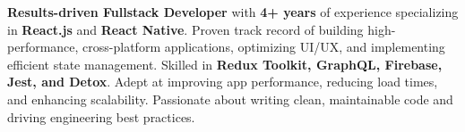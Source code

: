 \vspace{3pt}
\textbf{Results-driven Fullstack Developer} with \textbf{4+ years} of experience specializing in \textbf{React.js} and \textbf{React Native}. Proven track record of building high-performance, cross-platform applications, optimizing UI/UX, and implementing efficient state management. Skilled in \textbf{Redux Toolkit, GraphQL, Firebase, Jest, and Detox}. Adept at improving app performance, reducing load times, and enhancing scalability. Passionate about writing clean, maintainable code and driving engineering best practices.
